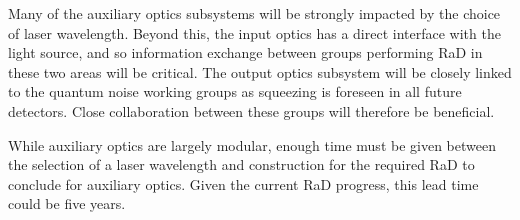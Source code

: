 
Many of the auxiliary optics subsystems will be strongly impacted by the choice of laser wavelength. Beyond this, the input optics has a direct interface with the light source, and so information exchange between groups performing \ac{RaD}  in these two areas will be critical.
The output optics subsystem will be closely linked to the quantum noise working groups as squeezing is foreseen in all future detectors. Close collaboration between these groups will therefore be beneficial.

While auxiliary optics are largely modular, enough time must be given between the selection of a laser wavelength and construction for the required \ac{RaD}  to conclude for auxiliary optics. Given the current \ac{RaD}  progress, this lead time could be five years. 
